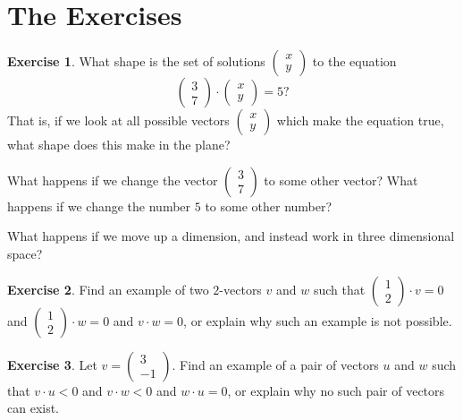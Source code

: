 \documentclass[11pt]{amsart}
\theoremstyle{definition}
\newtheorem{exercise}{Exercise}
\begin{document}
\section{The Exercises}

\setcounter{exercise}{12}

\begin{exercise}
What shape is the set of solutions $\left(\begin{smallmatrix} x \\ y\end{smallmatrix}\right)$ to the equation
\begin{equation*}
\begin{pmatrix} 3 \\ 7 \end{pmatrix} \cdot \begin{pmatrix} x \\ y \end{pmatrix} = 5?
\end{equation*}
That is, if we look at all possible vectors $\left( \begin{smallmatrix} x \\ y \end{smallmatrix} \right)$ which make the equation true, what shape does this make in the plane?

What happens if we change the vector $\left(\begin{smallmatrix} 3 \\ 7\end{smallmatrix}\right)$ to some other vector? What happens if we change the number $5$ to some other number?

What happens if we move up a dimension, and instead work in three dimensional space?
\end{exercise}

\begin{exercise}
Find an example of two $2$-vectors $v$ and $w$ such that $\left(\begin{smallmatrix} 1 \\ 2 \end{smallmatrix}\right) \cdot v =0$ and $\left(\begin{smallmatrix} 1 \\ 2 \end{smallmatrix}\right) \cdot w = 0$ and $v\cdot w = 0$, or explain why such an example is not possible.
\end{exercise}

\begin{exercise}
Let $v = \left( \begin{smallmatrix} 3 \\ -1 \end{smallmatrix} \right)$. Find an example of a pair of vectors $u$ and $w$ such that $v \cdot u < 0$ and $v \cdot w < 0$ and $w\cdot u =0$, or explain why no such pair of vectors can exist.
\end{exercise}
\end{document}
